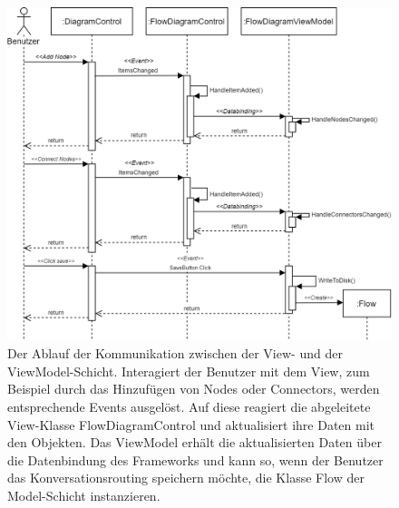 \begin{figure} %
	\centering
		\includegraphics[width=\textwidth]{img/MVVMSequence.png}
	\caption[Kommunikationsablauf zwischen View- und ViewModel-Schicht]{Der Ablauf der Kommunikation zwischen der View- und der ViewModel-Schicht. Interagiert der Benutzer mit dem View, zum Beispiel durch das Hinzufügen von Nodes oder Connectors, werden entsprechende Events ausgelöst. Auf diese reagiert die abgeleitete View-Klasse FlowDiagramControl und aktualisiert ihre Daten mit den Objekten. Das ViewModel erhält die aktualisierten Daten über die Datenbindung des Frameworks und kann so, wenn der Benutzer das Konversationsrouting speichern möchte, die Klasse Flow der Model-Schicht instanzieren.}
	\label{fig:UML:MVVMSequence}
\end{figure}

